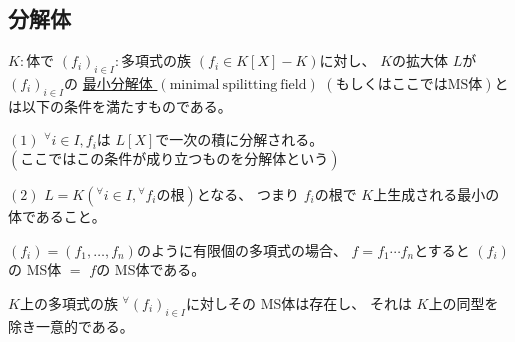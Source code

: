 \documentclass[../master_galois_theory]{subfiles}
\begin{document}
\subsection{分解体}

\begin{defi}
  $K:$体で $(f_i)_{i \in I}:$多項式の族 $(f_i \in K[X] - K)$に対し、
  $K$の拡大体 $L$が $(f_i)_{i \in I}$の
  \underline{最小分解体 $(\mathrm{minimal \  spilitting \  field})$}
  $(もしくはここでは \mathrm{MS}体)$とは以下の条件を満たすものである。

  $(1)$
  ${}^\forall i \in I , f_i$は $L[X]$で一次の積に分解される。
  $(ここではこの条件が成り立つものを分解体という)$

  $(2)$
  $L = K({}^\forall i \in I , {}^\forall f_i の根)$となる、
  つまり $f_i$の根で $K$上生成される最小の体であること。
\end{defi}

\begin{rem}
  $(f_i) = (f_1 , \dots , f_n)$のように有限個の多項式の場合、
  $f = f_1 \cdots f_n$とすると
  $(f_i)$の \rm{MS}体 $=$ $f$の \rm{MS}体である。
\end{rem}

\begin{prop} \label{prop:7.4}
  $K$上の多項式の族 ${}^\forall (f_i)_{i \in I}$に対しその \rm{MS}体は存在し、
  それは $K$上の同型を除き一意的である。
\end{prop}
\end{document}
